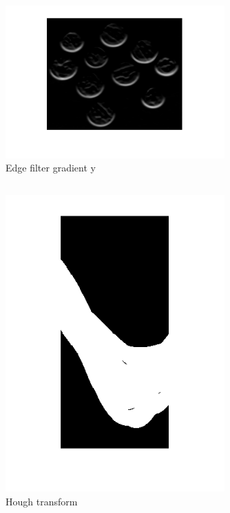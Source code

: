 \documentclass[12pt]{article}
\begin{document}
\begin{figure}[H] \centering \includegraphics[page=1,width=0.75\textwidth]{edgefilter_iy}
\caption{Edge filter gradient y}    \end{figure}   


\newpage
\subsection{}
\begin{figure}[H] \centering \includegraphics[page=1,width=0.75\textwidth]{hough}
\caption{Hough transform}    \end{figure}   


\newpage
\end{document}
